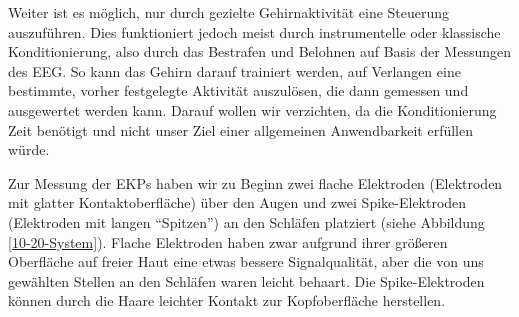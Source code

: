 \documentclass[11pt]{scrartcl}
\begin{document}
	\begin{figure}[h!]
	\end{figure}

	Weiter ist es möglich, nur durch gezielte Gehirnaktivität eine Steuerung auszuführen. Dies funktioniert jedoch meist durch instrumentelle oder klassische Konditionierung, also durch das Bestrafen und Belohnen auf Basis der Messungen des EEG. So kann das Gehirn darauf trainiert werden, auf Verlangen eine bestimmte, vorher festgelegte Aktivität auszulösen, die dann gemessen und ausgewertet werden kann. \cite{BCIChaudhary} Darauf wollen wir verzichten, da die Konditionierung Zeit benötigt und nicht unser Ziel einer allgemeinen Anwendbarkeit erfüllen würde.
	

	Zur Messung der EKPs haben wir zu Beginn zwei flache Elektroden (Elektroden mit glatter Kontaktoberfläche) über den Augen und zwei Spike-Elektroden (Elektroden mit langen \enquote{Spitzen}) an den Schläfen platziert (siehe Abbildung \ref{10-20-System}). Flache Elektroden haben zwar aufgrund ihrer größeren Oberfläche auf freier Haut eine etwas bessere Signalqualität, aber die von uns gewählten Stellen an den Schläfen waren leicht behaart. Die Spike-Elektroden können durch die Haare leichter Kontakt zur Kopfoberfläche herstellen.
\end{document}
